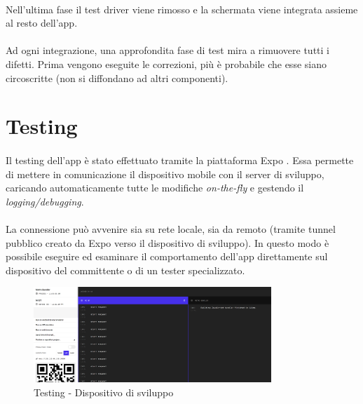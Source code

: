 \documentclass[12pt,a4paper,twoside,english,italian]{book}
\begin{document}
\paragraph{} Nell'ultima fase il test driver viene rimosso e la schermata viene integrata assieme al resto dell'app. 

\paragraph{} Ad ogni integrazione, una approfondita fase di test mira a rimuovere tutti i difetti. Prima vengono eseguite le correzioni, più è probabile che esse siano circoscritte (non si diffondano ad altri componenti).

\section{Testing}

\paragraph{} Il testing dell'app è stato effettuato tramite la piattaforma Expo \cite{expo}. Essa permette di mettere in comunicazione il dispositivo mobile con il server di sviluppo, caricando automaticamente tutte le modifiche \emph{on-the-fly} e gestendo il \emph{logging/debugging}.

\paragraph{} La connessione può avvenire sia su rete locale, sia da remoto (tramite tunnel pubblico creato da Expo verso il dispositivo di sviluppo). In questo modo è possibile eseguire ed esaminare il comportamento dell'app direttamente sul dispositivo del committente o di un tester specializzato.  

\begin{figure}[H]
    \centering
    \includegraphics[width=0.8\textwidth]{img/debug_app_pc.png}
    \caption{Testing - Dispositivo di sviluppo}
\end{figure}
\end{document}
